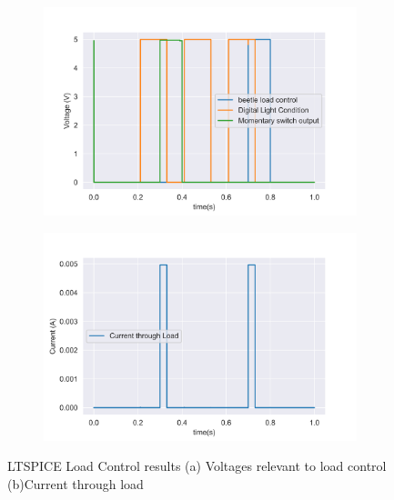 \begin{figure}[!htb]
	\footnotesize
	\centering
	\begin{subfigure}[]{0.386\textwidth}
		\centering
		\includegraphics[width=1\linewidth]{./Figures/A7/A72loadcontsim.png}
		\caption{} \label{subfig:A7voltages}
	\end{subfigure}
	\begin{subfigure}[]{0.46\textwidth}
		\centering
		\includegraphics[width=1\linewidth]{./Figures/A7/A72loadcontsimcurr.png}
		\caption{ } \label{subfig:A7current}
	\end{subfigure}
	\caption[{LTSPICE Load Control results}]{LTSPICE Load Control results   (a)  Voltages relevant to load control (b)Current through load }
	\label{fig:loadcontA7}
\end{figure}

